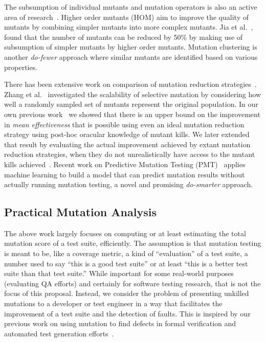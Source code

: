 The subsumption of individual mutants and mutation operators is also an active
area of research~\cite{gopinath2016measuring,shin2016theoretical,lindstrom2015redundant}.
Higher order mutants (HOM) aim to improve the quality of
mutants by combining simpler mutants into more complex mutants. Jia et
al.~\cite{jia2009higher,jia2008constructing}, found that the number of mutants
can be reduced by 50\% by making use of subsumption of simpler mutants
by higher order mutants.
Mutation clustering\cite{derezinska2015toward,strug2012machine,hussain2008mutation} is another \emph{do-fewer}
approach where similar mutants are identified based on various
properties.

There has been extensive work on comparison of mutation
reduction strategies~\cite{zhang2010isoperator,zhang2013operator}.
Zhang et al.~\cite{zhang2014an} investigated the scalability of
selective mutation by considering how well a randomly sampled set of mutants
represent the original population. 
In our own previous work~\cite{gopinath2016on} we showed that there is
an upper bound on the improvement
in \emph{mean effectiveness} that is possible using even
an ideal mutation reduction strategy using post-hoc oracular knowledge of mutant
kills. We later extended that result by evaluating the actual improvement
achieved by extant mutation reduction strategies, when they do not
unrealistically have access to the
mutant kills achieved~\cite{gopinath2017mutation}.  Recent work on Predictive 
Mutation Testing (PMT)~\cite{zhang2016predictive} applies machine 
learning to build a model that can predict mutation results without 
actually running mutation testing, a novel and promising
\emph{do-smarter} approach.



\subsection{Practical Mutation Analysis}

The above work largely focuses on computing or at least estimating the
total mutation score of a
test suite, efficiently.  The assumption is that mutation testing is
meant to be, like a coverage metric, a kind of ``evaluation'' of a
test suite, a number used to say ``this is a good test suite'' or at
least ``this is a better test suite than that test suite.''  While
important for some real-world purposes (evaluating QA efforts) and
certainly for software testing research, that is not the focus of this
proposal.  Instead, we consider the problem of presenting unkilled mutations to
a developer or test engineer in a way that facilitates the improvement
of a test suite and the detection of faults.  This is inspired by our
previous work on using mutation to find defects in formal verification
and automated test generation
efforts~\cite{groce2015verified,groce2018verified,mutKernel}.

